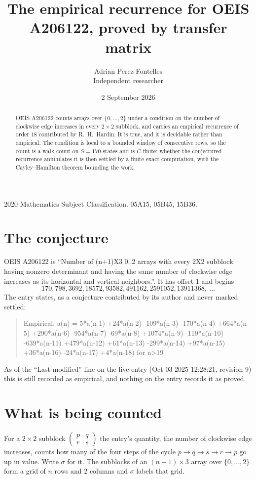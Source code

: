 \documentclass[11pt,a4paper]{article}
\title{The empirical recurrence for OEIS A206122, proved by transfer matrix}
\author{Adrian Perez Fontelles\\ \small Independent researcher}
\date{2 September 2026}
\theoremstyle{plain}
\theoremstyle{definition}
\begin{document}
\maketitle

\begin{abstract}
OEIS A206122 counts arrays over $\{0,\dots,2\}$ under a condition on the number of clockwise edge increases
in every $2\times2$ subblock, and carries an empirical recurrence of order $18$ contributed by
R.~H.~Hardin. It is true, and it is decidable rather than empirical. The condition is local to
a bounded window of consecutive rows, so the count is a walk count on $S=170$ states and is
$C$-finite; whether the conjectured recurrence annihilates it is then settled by a finite exact
computation, with the Cayley--Hamilton theorem bounding the work.
\end{abstract}

\noindent\small 2020 Mathematics Subject Classification. 05A15, 05B45, 15B36.\normalsize

\section{The conjecture}

OEIS A206122 is ``Number of (n+1)X3 0..2 arrays with every 2X2 subblock having nonzero determinant and having the same number of clockwise edge increases as its horizontal and vertical neighbors.''. It has offset $1$ and begins
\[
170, 798, 3692, 18572, 93582, 491162, 2591052, 13911368,\ \dots
\]
The entry states, as a conjecture contributed by its author and never marked settled:
\begin{quote}
Empirical: a(n) = 5*a(n-1) +24*a(n-2) -109*a(n-3) -170*a(n-4) +664*a(n-5) +290*a(n-6) -954*a(n-7) -69*a(n-8) +1074*a(n-9) -119*a(n-10) -639*a(n-11) +479*a(n-12) +61*a(n-13) -299*a(n-14) +97*a(n-15) +36*a(n-16) -24*a(n-17) +4*a(n-18) for n>19
\end{quote}
As of the ``Last modified'' line on the live entry (Oct 03 2025 12:28:21, revision 9) this is still
recorded as empirical, and nothing on the entry records it as proved.

\section{What is being counted}

For a $2\times2$ subblock $\begin{pmatrix}p&q\\r&s\end{pmatrix}$ the
entry's quantity, the number of clockwise edge increases, counts how many of the four steps of the cycle $p\to q\to s\to r\to p$ go up in value. Write $\sigma$ for it. The subblocks of an
$(n+1)\times3$ array over $\{0,\dots,2\}$ form a grid of $n$ rows and $2$
columns and $\sigma$ labels that grid.
\end{document}
